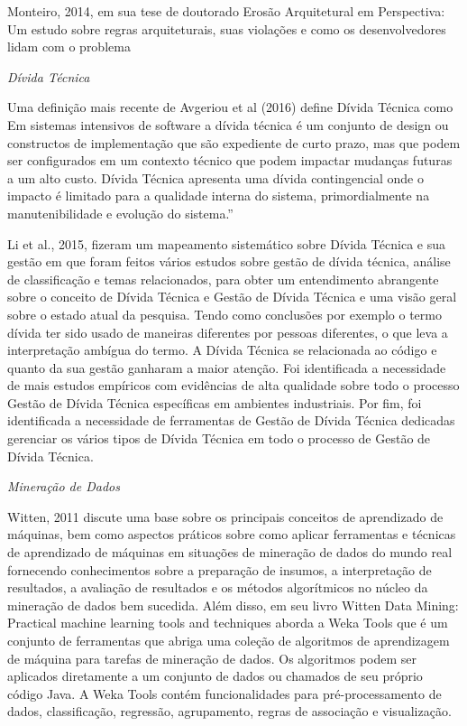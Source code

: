\documentclass[
	12pt,				%
	openright,			%
	twoside,			%
	a4paper,			%
	english,			%
	french,				%
	spanish,			%
	brazil,				%
	]{abntex2}
\begin{document}
Monteiro, 2014, em sua tese de doutorado \textquotedbl{}Erosão Arquitetural
em Perspectiva: Um estudo sobre regras arquiteturais, suas violações
e como os desenvolvedores lidam com o problema\textquotedbl{} 

\emph{Dívida Técnica }

Uma definição mais recente de Avgeriou et al (2016) define Dívida
Técnica como \textquotedbl{}Em sistemas intensivos de software a dívida
técnica é um conjunto de design ou constructos de implementação que
são expediente de curto prazo, mas que podem ser configurados em um
contexto técnico que podem impactar mudanças futuras a um alto custo.
Dívida Técnica apresenta uma dívida contingencial onde o impacto é
limitado para a qualidade interna do sistema, primordialmente na manutenibilidade
e evolução do sistema.\textquotedblright {}

Li et al., 2015, fizeram um mapeamento sistemático sobre Dívida Técnica
e sua gestão em que foram feitos vários estudos sobre gestão de dívida
técnica, análise de classificação e temas relacionados, para obter
um entendimento abrangente sobre o conceito de Dívida Técnica e Gestão
de Dívida Técnica e uma visão geral sobre o estado atual da pesquisa.
Tendo como conclusões por exemplo o termo \textquotedbl{}dívida\textquotedbl{}
ter sido usado de maneiras diferentes por pessoas diferentes, o que
leva a interpretação ambígua do termo. A Dívida Técnica se relacionada
ao código e quanto da sua gestão ganharam a maior atenção. Foi identificada
a necessidade de mais estudos empíricos com evidências de alta qualidade
sobre todo o processo Gestão de Dívida Técnica específicas em ambientes
industriais. Por fim, foi identificada a necessidade de ferramentas
de Gestão de Dívida Técnica dedicadas gerenciar os vários tipos de
Dívida Técnica em todo o processo de Gestão de Dívida Técnica. 

\emph{Mineração de Dados }

Witten, 2011 discute uma base sobre os principais conceitos de aprendizado
de máquinas, bem como aspectos práticos sobre como aplicar ferramentas
e técnicas de aprendizado de máquinas em situações de mineração de
dados do mundo real fornecendo conhecimentos sobre a preparação de
insumos, a interpretação de resultados, a avaliação de resultados
e os métodos algorítmicos no núcleo da mineração de dados bem sucedida.
Além disso, em seu livro Witten  \textquotedbl{}Data Mining: Practical
machine learning tools and techniques\textquotedbl{} aborda a Weka
Tools que é um conjunto de ferramentas que abriga uma coleção de algoritmos
de aprendizagem de máquina para tarefas de mineração de dados. Os
algoritmos podem ser aplicados diretamente a um conjunto de dados
ou chamados de seu próprio código Java. A Weka Tools contém funcionalidades
para pré-processamento de dados, classificação, regressão, agrupamento,
regras de associação e visualização. 
\end{document}
